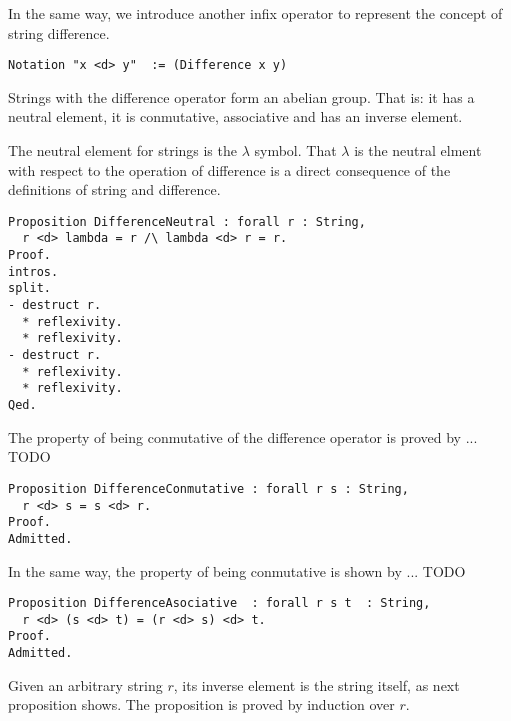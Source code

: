 In the same way, we introduce another infix operator to represent the concept of string difference.

\begin{sourcecode}
{\scriptsize \begin{verbatim}
Notation "x <d> y"  := (Difference x y)
\end{verbatim}}
\end{sourcecode}

Strings with the difference operator form an abelian group. That is: it has a neutral element, it is conmutative, associative and has an inverse element.

The neutral element for strings is the $\lambda$ symbol. That $\lambda$ is the neutral elment with respect to the operation of difference is a direct consequence of the definitions of string and difference.

\begin{sourcecode}
{\scriptsize \begin{verbatim}
Proposition DifferenceNeutral : forall r : String,
  r <d> lambda = r /\ lambda <d> r = r.
Proof.
intros.
split.
- destruct r.
  * reflexivity.
  * reflexivity.
- destruct r.
  * reflexivity.
  * reflexivity.
Qed.
\end{verbatim}}
\end{sourcecode}

The property of being conmutative of the difference operator is proved by ... {\color{red} TODO}

\begin{sourcecode}
{\scriptsize \begin{verbatim}
Proposition DifferenceConmutative : forall r s : String,
  r <d> s = s <d> r.
Proof.
Admitted.
\end{verbatim}}
\end{sourcecode}

In the same way, the property of being conmutative is shown by ... {\color{red} TODO}

\begin{sourcecode}
{\scriptsize \begin{verbatim}
Proposition DifferenceAsociative  : forall r s t  : String,
  r <d> (s <d> t) = (r <d> s) <d> t.
Proof.
Admitted.
\end{verbatim}}
\end{sourcecode}

Given an arbitrary string $r$, its inverse element is the string itself, as next proposition shows. The proposition is proved by induction over $r$.

